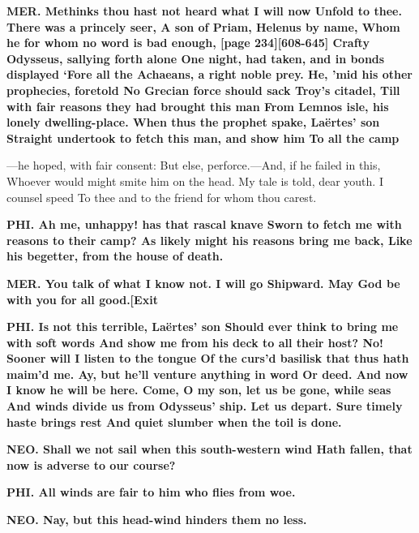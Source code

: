 \documentclass[11pt,letter]{book}
\begin{document}
\par \textbf{MER. Methinks thou hast not heard what I will now Unfold to thee. There was a princely seer, A son of Priam, Helenus by name, Whom he for whom no word is bad enough, [page 234][608-645] Crafty Odysseus, sallying forth alone One night, had taken, and in bonds displayed ‘Fore all the Achaeans, a right noble prey. He, ’mid his other prophecies, foretold No Grecian force should sack Troy’s citadel, Till with fair reasons they had brought this man From Lemnos isle, his lonely dwelling-place. When thus the prophet spake, Laërtes’ son Straight undertook to fetch this man, and show him To all the camp}
\par  —he hoped, with fair consent:  But else, perforce.—And, if he failed in this, Whoever would might smite him on the head. My tale is told, dear youth. I counsel speed To thee and to the friend for whom thou carest.

\par \textbf{PHI. Ah me, unhappy! has that rascal knave Sworn to fetch me with reasons to their camp? As likely might his reasons bring me back, Like his begetter, from the house of death.}
\par 

\par \textbf{MER. You talk of what I know not. I will go Shipward. May God be with you for all good.[Exit}
\par 

\par \textbf{PHI. Is not this terrible, Laërtes’ son Should ever think to bring me with soft words And show me from his deck to all their host? No! Sooner will I listen to the tongue Of the curs’d basilisk that thus hath maim’d me. Ay, but he’ll venture anything in word Or deed. And now I know he will be here. Come, O my son, let us be gone, while seas And winds divide us from Odysseus’ ship. Let us depart. Sure timely haste brings rest And quiet slumber when the toil is done.}
\par 

\par \textbf{NEO. Shall we not sail when this south-western wind Hath fallen, that now is adverse to our course?}
\par 

\par \textbf{PHI. All winds are fair to him who flies from woe.}
\par 

\par \textbf{NEO. Nay, but this head-wind hinders them no less.}
\par 
\end{document}
